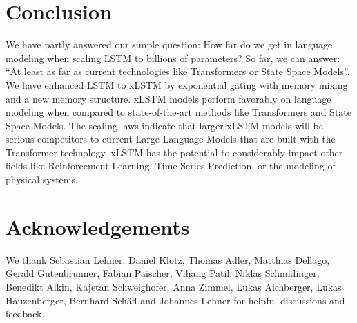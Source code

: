 \documentclass[dvipsnames]{article}
\begin{document}

\section{Conclusion}
We have partly answered our simple question: 
How far do we get in language modeling 
when scaling LSTM to billions of parameters?
So far, we can answer: ``At least as far as current technologies 
like Transformers or State Space Models''.
We have enhanced LSTM to xLSTM by exponential gating with memory mixing
and a new memory structure. 
xLSTM models perform favorably on language modeling
when compared to state-of-the-art methods like Transformers and 
State Space Models.
The scaling laws indicate that larger xLSTM models will
be serious competitors to current Large Language Models 
that are built with the Transformer technology.
xLSTM has the potential to considerably impact other fields
like Reinforcement Learning, Time Series Prediction, 
or the modeling of physical systems.




\section*{Acknowledgements}
We thank Sebastian Lehner, Daniel Klotz, Thomas Adler, Matthias Dellago, Gerald Gutenbrunner, Fabian Paischer, Vihang Patil, Niklas Schmidinger, Benedikt Alkin, Kajetan Schweighofer, Anna Zimmel, Lukas Aichberger, Lukas Hauzenberger, Bernhard Schäfl and Johannes Lehner for helpful discussions and feedback.

 

%

\end{document}
